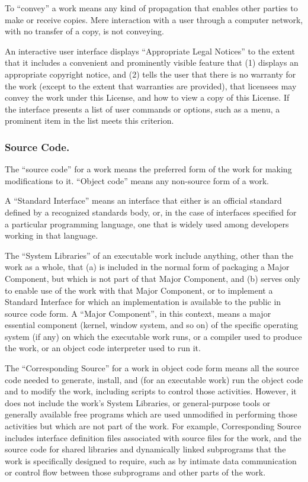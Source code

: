 \documentclass[10pt,english]{article}
\begin{document}
To \textquotedblleft{}convey\textquotedblright{} a work means any
kind of propagation that enables other parties to make or receive
copies. Mere interaction with a user through a computer network, with
no transfer of a copy, is not conveying.

An interactive user interface displays \textquotedblleft{}Appropriate
Legal Notices\textquotedblright{} to the extent that it includes a
convenient and prominently visible feature that (1) displays an appropriate
copyright notice, and (2) tells the user that there is no warranty
for the work (except to the extent that warranties are provided),
that licensees may convey the work under this License, and how to
view a copy of this License. If the interface presents a list of user
commands or options, such as a menu, a prominent item in the list
meets this criterion.


\subsubsection{Source Code.}

The \textquotedblleft{}source code\textquotedblright{} for a work
means the preferred form of the work for making modifications to it.
\textquotedblleft{}Object code\textquotedblright{} means any non-source
form of a work.

A \textquotedblleft{}Standard Interface\textquotedblright{} means
an interface that either is an official standard defined by a recognized
standards body, or, in the case of interfaces specified for a particular
programming language, one that is widely used among developers working
in that language.

The \textquotedblleft{}System Libraries\textquotedblright{} of an
executable work include anything, other than the work as a whole,
that (a) is included in the normal form of packaging a Major Component,
but which is not part of that Major Component, and (b) serves only
to enable use of the work with that Major Component, or to implement
a Standard Interface for which an implementation is available to the
public in source code form. A \textquotedblleft{}Major Component\textquotedblright{},
in this context, means a major essential component (kernel, window
system, and so on) of the specific operating system (if any) on which
the executable work runs, or a compiler used to produce the work,
or an object code interpreter used to run it.

The \textquotedblleft{}Corresponding Source\textquotedblright{} for
a work in object code form means all the source code needed to generate,
install, and (for an executable work) run the object code and to modify
the work, including scripts to control those activities. However,
it does not include the work's System Libraries, or general-purpose
tools or generally available free programs which are used unmodified
in performing those activities but which are not part of the work.
For example, Corresponding Source includes interface definition files
associated with source files for the work, and the source code for
shared libraries and dynamically linked subprograms that the work
is specifically designed to require, such as by intimate data communication
or control flow between those subprograms and other parts of the work.
\end{document}
